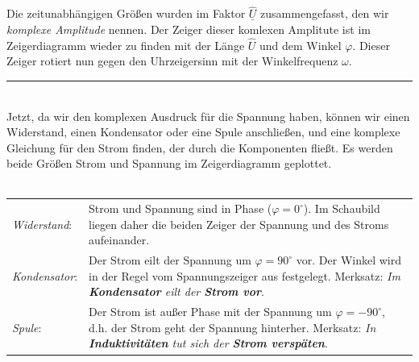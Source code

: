\documentclass{article}
\begin{document}
\begin{mdframed}
\begin{minipage}{0.4\textwidth}
\begin{align*}
\end{align*}
\end{minipage}
\hspace{2\baselineskip}
\begin{minipage}{0.3\textwidth}
\raisebox{-0.5\height}{}
\end{minipage}\\
\vspace{0.5\baselineskip}
\justify
Die zeitunabhängigen Größen wurden im Faktor $\underline{\hat{U}}$ zusammengefasst, den wir \textit{komplexe Amplitude} nennen. Der Zeiger dieser komlexen Amplitute ist im Zeigerdiagramm wieder zu finden mit der Länge $\hat{U}$ und dem Winkel $\varphi$. Dieser Zeiger rotiert nun gegen den Uhrzeigersinn mit der Winkelfrequenz $\omega$.\\
\centering
\rule{0.5\textwidth}{0.5pt}\\
\justify
Jetzt, da wir den komplexen Ausdruck für die Spannung haben, können wir einen Widerstand, einen Kondensator oder eine Spule anschließen, und eine komplexe Gleichung für den Strom finden, der durch die Komponenten fließt. Es werden beide Größen Strom und Spannung im Zeigerdiagramm geplottet.\\ \\
\vspace{0.5\baselineskip}
\begin{tabular}{p{}p{}}
     \textit{Widerstand}: & Strom und Spannung sind in Phase ($\varphi = 0^{\circ}$). Im Schaubild liegen daher die beiden Zeiger der Spannung und des Stroms aufeinander. \\
     \textit{Kondensator}: & Der Strom eilt der Spannung um $\varphi = 90^{\circ}$ vor. Der Winkel wird in der Regel vom Spannungszeiger aus festgelegt. Merksatz: \textit{Im \textbf{Kondensator} eilt der \textbf{Strom vor}}.\\
     \textit{Spule}: & Der Strom ist außer Phase mit der Spannung um $\varphi = -90^{\circ}$, d.h. der Strom geht der Spannung hinterher. Merksatz: \textit{In \textbf{Induktivitäten} tut sich der \textbf{Strom verspäten}}.
\end{tabular}\\
\centering
\vspace{1\baselineskip}
\raisebox{-0.5\height}{}\\
\raisebox{-0.5\height}{}\\
\raisebox{-0.5\height}{}\\

\end{mdframed}
\end{document}
